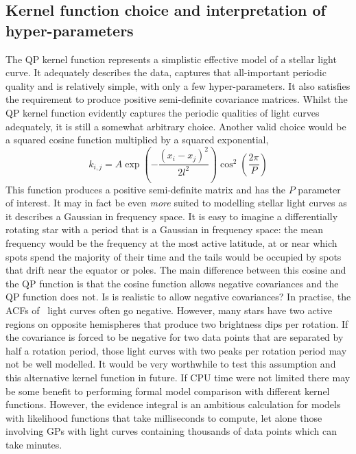 \subsection{Kernel function choice and interpretation of hyper-parameters}
The QP kernel function represents a simplistic effective model of a stellar
light curve.
It adequately describes the data, captures that all-important periodic quality
and is relatively simple, with only a few hyper-parameters.
It also satisfies the requirement to produce positive semi-definite covariance
matrices.
Whilst the QP kernel function evidently captures the periodic qualities of
light curves adequately, it is still a somewhat arbitrary choice.
Another valid choice would be a squared cosine function multiplied by a
squared exponential,
\begin{equation}
k_{i,j} = A \exp \left(-\frac{(x_i - x_j)^2}{2l^2}\right)
\cos^2\left(\frac{2\pi}{P}\right)
\end{equation}
\label{eq:cos_kernel}
This function produces a positive semi-definite matrix and has the $P$
parameter of interest.
It may in fact be even {\it more} suited to modelling stellar
light curves as it describes a Gaussian in frequency space.
It is easy to imagine a differentially rotating star with a period that is a
Gaussian in frequency space: the mean frequency would be the frequency at the
most active latitude, at or near which spots spend the majority of their time
and the tails would be occupied by spots that drift near the equator or poles.
The main difference between this cosine and the QP function is that the cosine
function allows negative covariances and the QP function does not.
Is is realistic to allow negative covariances?
In practise, the ACFs of \Kepler\ light curves often go negative.
However, many stars have two active regions on opposite hemispheres that
produce two brightness dips per rotation.
If the covariance is forced to be negative for two data points that are
separated by half a rotation period, those light curves with two peaks per
rotation period may not be well modelled.
It would be very worthwhile to test this assumption and this alternative
kernel function in future.
If CPU time were not limited there may be some benefit to performing formal
model comparison with different kernel functions.
However, the evidence integral is an ambitious calculation for models with
likelihood functions that take milliseconds to compute, let alone those
involving GPs with light curves containing thousands of data points which can
take minutes.

